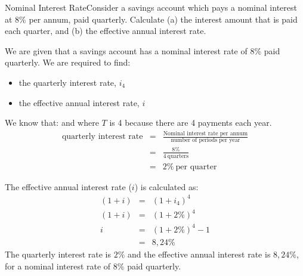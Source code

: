 \begin{wex}{Nominal Interest Rate}{Consider a savings account which pays a nominal interest at $8\%$ per annum, paid quarterly. Calculate (a) the interest amount that is paid each quarter, and (b) the effective annual interest rate.\\}
{
We are given that a savings account has a nominal interest rate of $8\%$ paid quarterly. We are required to find:
\begin{itemize}
\item{the quarterly interest rate, $i_4$}
\item{the effective annual interest rate, $i$\\}
\end{itemize}

We know that:
and
where $T$ is 4 because there are 4 payments each year.\\

\begin{eqnarray*}
\mbox{quarterly interest rate}&=&\frac{\mbox{Nominal interest rate per annum}}{\mbox{number of periods per year}}\\
&=& \frac{8\%}{4~\mbox{quarters}}\\
&=& 2\%~\mbox{per quarter}
\end{eqnarray*}

The effective annual interest rate ($i$) is calculated as:
\begin{eqnarray*}
(1 + i) &=& (1 + i_4)^{4}\\
(1+ i) &=& (1+ 2\%)^4\\
i &=& (1+ 2\%)^4 - 1\\
&=&8,24\%
\end{eqnarray*}
The quarterly interest rate is $2\%$ and the effective annual interest rate is $8,24\%$, for a nominal interest rate of $8\%$ paid quarterly.}
\end{wex}


